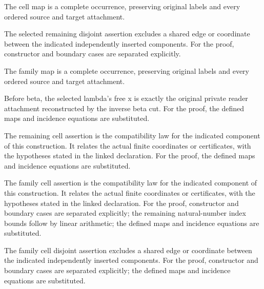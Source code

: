 The cell map is a complete occurrence, preserving original labels and every ordered source and target attachment.
\par{}

The selected remaining disjoint assertion excludes a shared edge or coordinate between the indicated independently inserted components.
For the proof, constructor and boundary cases are separated explicitly.
\par{}

The family map is a complete occurrence, preserving original labels and every ordered source and target attachment.
\par{}

Before beta, the selected lambda's free x is exactly the original private reader attachment reconstructed by the inverse beta cut.
For the proof, the defined maps and incidence equations are substituted.
\par{}

The remaining cell assertion is the compatibility law for the indicated component of this construction. It relates the actual finite coordinates or certificates, with the hypotheses stated in the linked declaration.
For the proof, the defined maps and incidence equations are substituted.
\par{}

The family cell assertion is the compatibility law for the indicated component of this construction. It relates the actual finite coordinates or certificates, with the hypotheses stated in the linked declaration.
For the proof, constructor and boundary cases are separated explicitly; the remaining natural-number index bounds follow by linear arithmetic; the defined maps and incidence equations are substituted.
\par{}

The family cell disjoint assertion excludes a shared edge or coordinate between the indicated independently inserted components.
For the proof, constructor and boundary cases are separated explicitly; the defined maps and incidence equations are substituted.
\par{}

